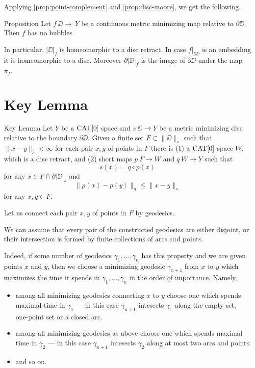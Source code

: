 \documentclass{article}
\begin{document}
Applying \ref{prop:point-complement} and \ref{prop:disc-moore}, we get the following.

\begin{thm}{Proposition}\label{prop:|D|}
Let $f\:\DD\to\ Y$ be a continuous metric minimizing map relative to $\partial \DD$.
Then $f$ has no bubbles.

In particular,  $|\DD|_f$ is homeomorphic to a disc retract. 
In case $f|_{\partial\DD}$ is an
embedding it is homeomorphic to a disc.
Moreover $\partial|\DD|_f$ is the image of $\partial \DD$
under the map $\pi_f$.
\end{thm}











\section{Key Lemma}\label{Key Lemma}


\begin{thm}{Key Lemma}\label{lem:key}
Let $Y$ be a $\mathop{\rm CAT}\nolimits[0]$ space and $s\:\DD\to Y$ 
be a metric minimizing disc relative to the boundary $\partial \DD$.
Given a finite set $F\subset \|\DD\|_s$ such that $\|x-y\|_s<\infty$ for each pair $x,y$ of points in $F$
there is 
(1) a $\mathop{\rm CAT}\nolimits[0]$ space $W$, which is a disc retract,
and (2) short maps $p\:F\to W$ and $q\:W\to Y$ such that
\[\bar s(x)=q\circ p(x)\] 
for any $x\in F\cap \partial |\DD|_s$
and 
\[\|p(x)-p(y)\|_q\le \|x-y\|_s\] 
for any $x,y\in F$.
\end{thm}

Let us connect each pair $x,y$ of points in $F$ by geodesics.

We can assume that 
every pair of the constructed geodesics 
are either disjoint, or their intersection is formed by finite collections of arcs and points.

Indeed, if some number of geodesics $\gamma_1,\dots,\gamma_n$ has this property and we are given points $x$ and $y$, then
we choose a minimizing geodesic $\gamma_{n+1}$ from $x$ to $y$ which maximizes the time it spends in $\gamma_1,\dots,\gamma_n$  in the order of importance.
Namely, 
\begin{itemize}
\item  among all minimizing geodesics connecting $x$ to $y$
choose one which spends maximal time in $\gamma_1$ --- in this case $\gamma_{n+1}$ intesects $\gamma_1$ along the empty set, one-point set or a closed arc.
\item among all minimizing geodesics as above
choose one which spends maximal time in $\gamma_2$ --- in this case $\gamma_{n+1}$ intesects $\gamma_2$ along at most two arcs and points.
\item and so on.
\end{itemize}
\end{document}

